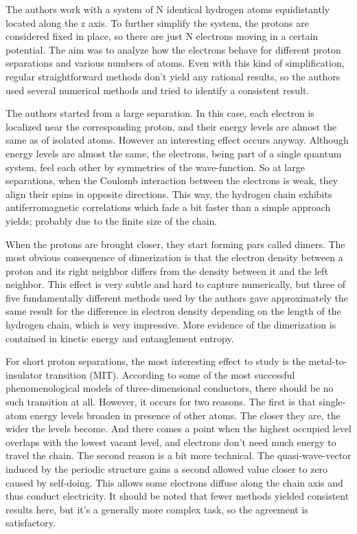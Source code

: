 \documentclass[a4paper, 12pt]{article}
\begin{document}
The authors work with a system of N identical hydrogen atoms 
equidistantly located along the z axis. To further simplify the system, 
the protons are considered fixed in place, so there are just N electrons 
moving in a certain potential. The aim was to analyze how the electrons 
behave for different proton separations and various numbers of atoms. 
Even with this kind of simplification, regular straightforward methods 
don't yield any rational results, so the authors used several numerical 
methods and tried to identify a consistent result.

The authors started from a large separation. In this case, each electron 
is localized near the corresponding proton, and their energy levels are 
almost the same as of isolated atoms. However an interesting effect 
occurs anyway. Although energy levels are almost the same, the 
electrons, being part of a single quantum system, feel each other by 
symmetries of the wave-function. So at large separations, when the 
Coulomb interaction between the electrons is weak, they align their 
spins in opposite directions. This way, the hydrogen chain exhibits 
antiferromagnetic correlations which fade a bit faster than a simple 
approach yields; probably due to the finite size of the chain.

When the protons are brought closer, they start forming pars called 
dimers. The most obvious consequence of dimerization is that the 
electron density between a proton and its right neighbor differs from 
the density between it and the left neighbor. This effect is very subtle 
and hard to capture numerically, but three of five fundamentally 
different methods used by the authors gave approximately the same result 
for the difference in electron density depending on the length of the 
hydrogen chain, which is very impressive. More evidence of the 
dimerization is contained in kinetic energy and entanglement entropy.

For short proton separations, the most interesting effect to study is 
the metal-to-insulator transition (MIT). According to some of the most 
successful phenomenological models of three-dimensional conductors, 
there should be no such transition at all. However, it occurs for two 
reasons. The first is that single-atom energy levels broaden in presence 
of other atoms. The closer they are, the wider the levels become. And 
there comes a point when the highest occupied level overlaps with the 
lowest vacant level, and electrons don't need much energy to travel the 
chain. The second reason is a bit more technical. The quasi-wave-vector 
induced by the periodic structure gains a second allowed value closer to 
zero caused by self-doing. This allows some electrons diffuse along the 
chain axis and thus conduct electricity. It should be noted that fewer 
methods yielded consistent results here, but it's a generally more 
complex task, so the agreement is satisfactory.
\end{document}
